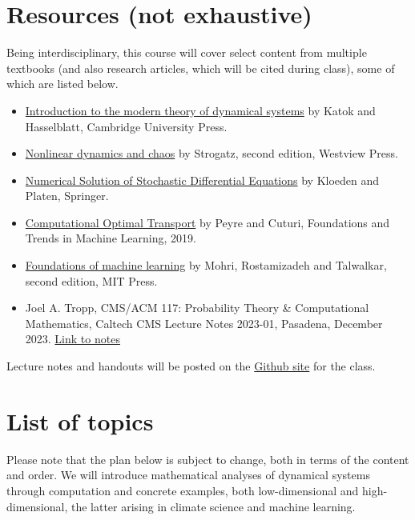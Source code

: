 \documentclass[12pt]{article}
\begin{document}
\section{Resources (not exhaustive)}
\label{sec:resources}
Being interdisciplinary, this course will cover select content from multiple textbooks (and also research articles, which will be cited during class), some of which are listed below. 
\begin{itemize}
	\item 
		\href{https://books.google.com/books?hl=en&lr=&id=9nL7ZX8Djp4C&oi=fnd&pg=PR7&dq=katok+and+hasselblatt&ots=oWieU2cCAH&sig=T-g4-msNhCCTTpoSyMb09ZhnF2Y#v=onepage&q=katok%20and%20hasselblatt&f=false}{Introduction to the modern theory of dynamical systems} by Katok and Hasselblatt, Cambridge University Press.
	\item  \href{https://books.google.com/books?hl=en&lr=&id=wUBvDwAAQBAJ&oi=fnd&pg=PT7&ots=AOtaTsiIyX&sig=MexxyAiFbXhsxZNKq6V7YLjjv5w#v=onepage&q&f=false}{Nonlinear dynamics and chaos} by Strogatz, second edition, Westview Press.
	\item \href{https://link.springer.com/book/10.1007/978-3-662-12616-5}{Numerical Solution of Stochastic Differential Equations} by Kloeden and Platen, Springer. 

	\item \href{https://www.nowpublishers.com/article/Details/MAL-073}{Computational Optimal Transport} by Peyre and Cuturi, Foundations and Trends in Machine Learning, 2019.
	\item \href{https://books.google.com/books?hl=en&lr=&id=dWB9DwAAQBAJ&oi=fnd&pg=PR5&dq=foundations+of+machine+learning+mohri&ots=AznTXOq_s4&sig=oFBecq2rS2nusMY-xRj1qD-0Dsk#v=onepage&q=foundations%20of%20machine%20learning%20mohri&f=false}{Foundations of machine learning} by Mohri, Rostamizadeh and Talwalkar, second edition, MIT Press.
	\item Joel A. Tropp, CMS/ACM 117: Probability Theory \& Computational Mathematics,
Caltech CMS Lecture Notes 2023-01, Pasadena, December 2023. \href{https://doi.org/10.7907/q75sz-e1e79}{Link to notes}
	
\end{itemize}
Lecture notes and handouts will be posted on the \href{https://github.com/ni-sha-c/}{Github site} for the class.

\section{List of topics}
\label{sec:topics}
Please note that the plan below is subject to change, both in terms of the content and order. We will introduce mathematical analyses of dynamical systems through computation and concrete examples, both low-dimensional and high-dimensional, the latter arising in climate science and machine learning. 
\end{document}

